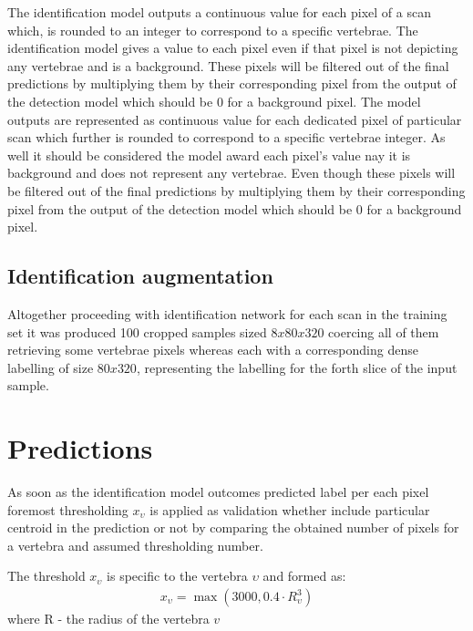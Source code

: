 The identification model outputs a continuous value for each pixel of a scan which, is rounded to an integer to correspond to a specific vertebrae. The identification model gives a value to each pixel even if that pixel is not depicting any vertebrae and is a background. These pixels will be filtered out of the final
predictions by multiplying them by their corresponding pixel from the output of the detection model which should be 0 for a background pixel. The model outputs are represented as continuous value for each dedicated pixel of particular scan which further is rounded to correspond to a specific vertebrae integer. As well it should be considered the model award each pixel's value nay it is background and does not represent any vertebrae. Even though these pixels will be filtered out of the final predictions by multiplying them by their corresponding pixel from the output of the detection model which should be 0 for a background pixel.

\subsection{Identification augmentation}
Altogether proceeding with identification network for each scan in the training set it was produced 100 cropped samples sized $8x80x320$ coercing all of them retrieving some vertebrae pixels whereas each with a corresponding dense labelling of size $80x320$, representing the labelling for the forth slice of the input sample.

\section{Predictions}
As soon as the identification model outcomes predicted label per each pixel foremost thresholding $x_\upsilon$ is applied as validation whether include particular centroid in the prediction or not by comparing the obtained  number of pixels for a vertebra and assumed thresholding number.

The threshold $x_\upsilon$ is specific to the vertebra $\upsilon$ and formed as:
\begin{align*}
  x_\upsilon = \max(3000, 0.4 \cdot R_\upsilon^3) 
\end{align*}
where R - the radius of the vertebra $v$
